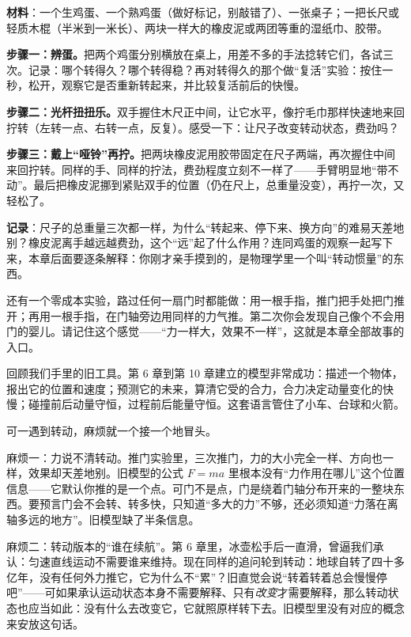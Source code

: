 \begin{experiment}
\textbf{材料}：一个生鸡蛋、一个熟鸡蛋（做好标记，别敲错了）、一张桌子；一把长尺或轻质木棍（半米到一米长）、两块一样大的橡皮泥或两团等重的湿纸巾、胶带。

\textbf{步骤一：辨蛋。}把两个鸡蛋分别横放在桌上，用差不多的手法捻转它们，各试三次。记录：哪个转得久？哪个转得稳？再对转得久的那个做“复活”实验：按住一秒，松开，观察它是否重新转起来，并比较复活前后的快慢。

\textbf{步骤二：光杆扭扭乐。}双手握住木尺正中间，让它水平，像拧毛巾那样快速地来回拧转（左转一点、右转一点，反复）。感受一下：让尺子改变转动状态，费劲吗？

\textbf{步骤三：戴上“哑铃”再拧。}把两块橡皮泥用胶带固定在尺子两端，再次握住中间来回拧转。同样的手、同样的拧法，费劲程度立刻不一样了——手臂明显地“带不动”。最后把橡皮泥挪到紧贴双手的位置（仍在尺上，总重量没变），再拧一次，又轻松了。

\textbf{记录}：尺子的总重量三次都一样，为什么“转起来、停下来、换方向”的难易天差地别？橡皮泥离手越远越费劲，这个“远”起了什么作用？连同鸡蛋的观察一起写下来，本章后面要逐条解释：你刚才亲手摸到的，是物理学里一个叫“转动惯量”的东西。
\end{experiment}

还有一个零成本实验，路过任何一扇门时都能做：用一根手指，推门把手处把门推开；再用一根手指，在门轴旁边用同样的力气推。第二次你会发现自己像个不会用门的婴儿。请记住这个感觉——“力一样大，效果不一样”，这就是本章全部故事的入口。


回顾我们手里的旧工具。第 6 章到第 10 章建立的模型非常成功：描述一个物体，报出它的位置和速度；预测它的未来，算清它受的合力，合力决定动量变化的快慢；碰撞前后动量守恒，过程前后能量守恒。这套语言管住了小车、台球和火箭。

可一遇到转动，麻烦就一个接一个地冒头。

麻烦一：力说不清转动。推门实验里，三次推门，力的大小完全一样、方向也一样，效果却天差地别。旧模型的公式 \(F=ma\) 里根本没有“力作用在哪儿”这个位置信息——它默认你推的是一个点。可门不是点，门是绕着门轴分布开来的一整块东西。要预言门会不会转、转多快，只知道“多大的力”不够，还必须知道“力落在离轴多远的地方”。旧模型缺了半条信息。

麻烦二：转动版本的“谁在续航”。第 6 章里，冰壶松手后一直滑，曾逼我们承认：匀速直线运动不需要谁来维持。现在同样的追问轮到转动：地球自转了四十多亿年，没有任何外力推它，它为什么不“累”？旧直觉会说“转着转着总会慢慢停吧”——可如果承认运动状态本身不需要解释、只有\emph{改变}才需要解释，那么转动状态也应当如此：没有什么去改变它，它就照原样转下去。旧模型里没有对应的概念来安放这句话。

